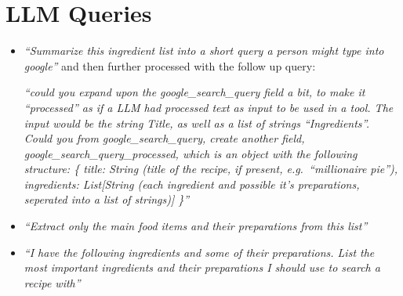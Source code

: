 \documentclass[11pt]{article}
\begin{document}
\section{LLM Queries}\label{app:llm}
\begin{itemize}
\item \emph{``Summarize this ingredient list into a short query a person might
    type into google''} and then further processed with the follow up query:

    \emph{``could you expand upon the google\_search\_query field a bit, to make
        it “processed” as if a LLM had processed text as input to be used in a
        tool.
        The input would be the string Title, as well as a list of strings
        “Ingredients”.
        Could you from google\_search\_query, create another field,
        google\_search\_query\_processed, which is an object with the following
        structure:
\{
title: String (title of the recipe, if present, e.g.\ ``millionaire pie''),
ingredients: List[String (each ingredient and possible it’s preparations,
seperated into a list of strings)]
\}''}
\item \emph{``Extract only the main food items and their preparations from
    this list''}
\item \emph{``I have the following ingredients and some of their
        preparations. List the most important ingredients and their
    preparations I should use to search a recipe with''} 
\end{itemize}
\end{document}

